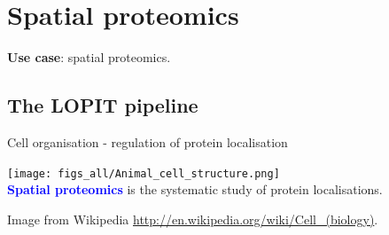 \section{Spatial proteomics}

\begin{frame}{}
  \begin{center}
    \Large{\textbf{Use case}: spatial proteomics.}
  \end{center}
\end{frame}

\subsection*{The LOPIT pipeline}

\label{sec:spintro}


\label{sec:spspatprot}

\begin{frame}{Cell organisation - regulation of protein localisation}
  \begin{center}
    \texttt{[image: figs\_all/Animal\_cell\_structure.png]} \\
    \textbf{\textcolor{Blue}{Spatial proteomics}} is the systematic
    study of protein localisations.
  \end{center}

  \tiny Image from Wikipedia
  \url{http://en.wikipedia.org/wiki/Cell_(biology)}.
\end{frame}


